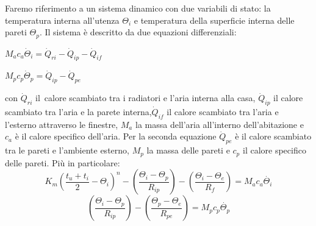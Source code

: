 \documentclass[laurea,oneside,11pt]{USiena_tesiLM}
\begin{document}
Faremo riferimento a un sistema dinamico con due variabili di stato: la temperatura interna all'utenza  $\Theta_i$  e  temperatura della superficie interna delle pareti  $\Theta_p$. Il sistema è  descritto  da due equazioni differenziali:
\begin{center}
$M_ac_a \dot{\Theta}_i = \dot{Q}_{ri} - \dot{Q}_{ip} - \dot{Q}_{if}$ 
\end{center}
\begin{center}
$M_pc_p \dot{\Theta}_p = \dot{Q}_{ip} - \dot{Q}_{pe}$
\end{center}
con $\dot{Q}_{ri}$ il\ calore scambiato tra i radiatori e l'aria interna alla casa, $\dot{Q}_{ip}$ il calore scambiato tra l'aria e la parete interna,$\dot{Q}_{if}$ il calore scambiato tra l'aria e l'esterno attraverso le finestre, $M_a$ la massa dell'aria all'interno dell'abitazione e $c_a$ è il calore specifico dell'aria. Per la seconda equazione $ \dot{Q}_{pe}$ è il calore scambiato tra le pareti e l'ambiente esterno, $M_p$ la massa delle pareti e $c_p$ il calore specifico delle pareti.
Più in particolare:
\begin{equation}
K_m\left(\frac{t_u + t_i}{2} - \Theta_{i}\right)^n - \left(\frac{\Theta_{i} - \Theta_p}{R_{ip}}\right) - \left(\frac{\Theta_{i} - \Theta_e}{R_{f}}\right) = M_ac_a \dot{\Theta_i}
\end{equation}
\begin{equation}
\left(\frac{\Theta_{i} - \Theta_p}{R_{ip}}\right) - \left(\frac{\Theta_{p} - \Theta_e}{R_{pe}}\right) = M_pc_p \dot{\Theta_p}
\end{equation}
\end{document}
